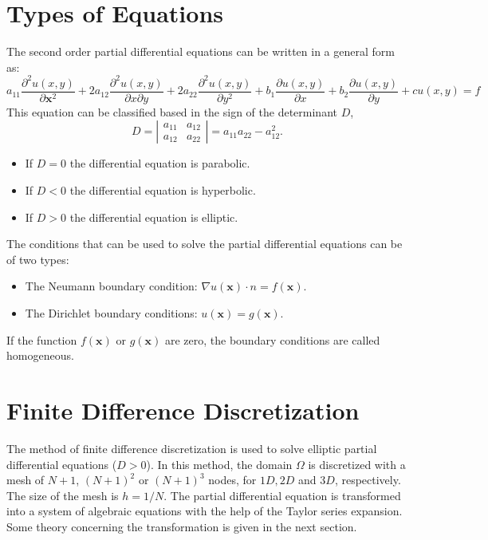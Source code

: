 \documentclass[12pt]{report}
\begin{document}
\section{Types of Equations}
The second order partial differential equations can be written in a general form as:
\begin{equation*}
 a_{11}\frac{\partial^2 u(x,y)}{\partial\mathbf{x}^2}+2a_{12}\frac{\partial^2 u(x,y)}{\partial x \partial y}+2a_{22}\frac{\partial^2 u(x,y)}{\partial y^2}
 +b_1\frac{\partial u(x,y)}{\partial x}+b_2\frac{\partial u(x,y)}{\partial y}+cu(x,y)=f
\end{equation*}
This equation can be classified based in the sign of the determinant $D$,
$$D= \left|\begin{array}{cc}
a_{11} & a_{12}\\
a_{12} & a_{22}
\end{array}\right|=a_{11}a_{22}-a^2_{12}.$$
\begin{itemize}
 \item If $D=0$ the differential equation is parabolic.
 \item If $D<0$ the differential equation is hyperbolic.
 \item If $D>0$ the differential equation is elliptic.
\end{itemize}
The conditions that can be used to solve the partial differential equations can be of two types:
\begin{itemize}
\item {The Neumann} boundary condition: $\nabla u(\mathbf{x})\cdot n=f(\mathbf{x})$.
\item {The Dirichlet} boundary conditions: $u(\mathbf{x})=g(\mathbf{x})$.
\end{itemize}
If the function $f(\mathbf{x})$ or $g(\mathbf{x})$ are zero, the boundary conditions are called homogeneous.
\section{Finite Difference Discretization}
The method of finite difference discretization is used to solve elliptic partial differential
 equations ($D>0$). In this method, the domain $\Omega$ is discretized with a mesh of $N+1$, $(N+1)^2$ or $(N+1)^3$ nodes, for
 $1D,2D$ and $3D$, respectively. The size of the mesh is $h=1/N$. The partial differential equation is transformed into 
 a system of algebraic equations with the help of the Taylor series expansion. Some theory concerning the transformation is given in the next section.
\end{document}

